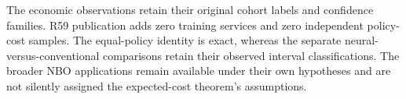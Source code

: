 The economic observations retain their original cohort labels and confidence families. R59 publication adds zero training services and zero independent policy-cost samples. The equal-policy identity is exact, whereas the separate neural-versus-conventional comparisons retain their observed interval classifications. The broader NBO applications remain available under their own hypotheses and are not silently assigned the expected-cost theorem's assumptions.
